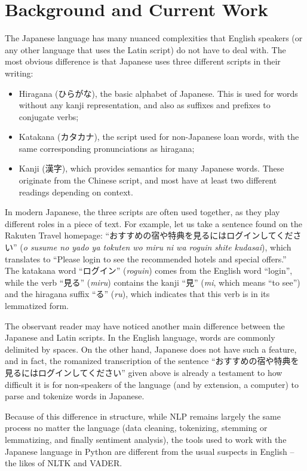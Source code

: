 \documentclass[12pt]{article}
\begin{document}
	\section{Background and Current Work}
	The Japanese language has many nuanced complexities that English speakers (or any other language that uses the Latin script) do not have to deal with. The most obvious difference is that Japanese uses three different scripts in their writing: \begin{itemize}
		\item Hiragana (ひらがな), the basic alphabet of Japanese. This is used for words without any kanji representation, and also as suffixes and prefixes to conjugate verbs;
		\item Katakana (カタカナ), the script used for non-Japanese loan words, with the same corresponding pronunciations as hiragana;
		\item Kanji (漢字), which provides semantics for many Japanese words. These originate from the Chinese script, and most have at least two different readings depending on context.
	\end{itemize} In modern Japanese, the three scripts are often used together, as they play different roles in a piece of text. For example, let us take a sentence found on the Rakuten Travel homepage: ``おすすめの宿や特典を見るにはログインしてください'' (\textit{o susume no yado ya tokuten wo miru ni wa roguin shite kudasai}), which translates to ``Please login to see the recommended hotels and special offers.''\\
	The katakana word ``ログイン'' (\textit{roguin}) comes from the English word ``login'', while the verb ``見る'' (\textit{miru}) contains the kanji ``見'' (\textit{mi}, which means ``to see'') and the hiragana suffix ``る'' (\textit{ru}), which indicates that this verb is in its lemmatized form.
	
	The observant reader may have noticed another main difference between the Japanese and Latin scripts. In the English language, words are commonly delimited by spaces. On the other hand, Japanese does not have such a feature, and in fact, the romanized transcription of the sentence ``おすすめの宿や特典を見るにはログインしてください'' given above is already a testament to how difficult it is for non-speakers of the language (and by extension, a computer) to parse and tokenize words in Japanese.
	
	Because of this difference in structure, while NLP remains largely the same process no matter the language (data cleaning, tokenizing, stemming or lemmatizing, and finally sentiment analysis), the tools used to work with the Japanese language in Python are different from the usual suspects in English -- the likes of NLTK and VADER.
	
\end{document}
